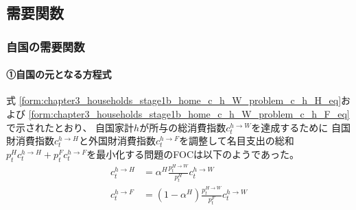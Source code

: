 
\subsection{需要関数}
\label{sec:chapter3_representative_household_demand}

\subsubsection{自国の需要関数}
\label{sec:chapter3_representative_household_demand_home}

\paragraph{①自国の元となる方程式}
\label{sec:chapter3_representative_household_demand_home_original}
式
\eqref{form:chapter3_households_stage1b_home_c_h_W_problem_c_h_H_eq}および
\eqref{form:chapter3_households_stage1b_home_c_h_W_problem_c_h_F_eq}
で示されたとおり、
自国家計\(h\)が所与の総消費指数\(c_t^{h\to W}\)を達成するために
自国財消費指数\(c_t^{h\to H}\)と外国財消費指数\(c_t^{h\to F}\)を調整して名目支出の総和
\(p_t^Hc_t^{h\to H}+p_t^Fc_t^{h\to F}\)を最小化する問題のFOCは以下のようであった。
\begin{align}
\label{form:chapter3_representative_household_demand_home_original_c_h_W_problem_c_h_H_eq}
    c_t^{h\to H}&=\alpha^H\frac{p_t^{H\to W}}{p_t^H}c_t^{h\to W} \\
\label{form:chapter3_representative_household_demand_home_original_c_h_W_problem_c_h_F_eq}
    c_t^{h\to F}&=(1-\alpha^H)\frac{p_t^{H\to W}}{p_t^F}c_t^{h\to W}
\end{align}

